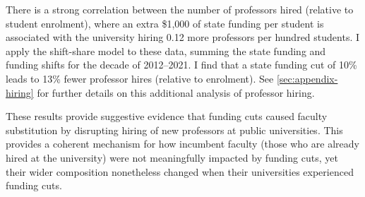 There is a strong correlation between the number of professors hired (relative to student enrolment), where an extra \$1,000 of state funding per student is associated with the university hiring 0.12 more professors per hundred students.
I apply the shift-share model to these data, summing the state funding and funding shifts for the decade of 2012--2021.
I find that a state funding cut of 10\% leads to 13\% fewer professor hires (relative to enrolment).
See \autoref{sec:appendix-hiring} for further details on this additional analysis of professor hiring.

These results provide suggestive evidence that funding cuts caused faculty substitution by disrupting hiring of new professors at public universities.
This provides a coherent mechanism for how incumbent faculty (those who are already hired at the university) were not meaningfully impacted by funding cuts, yet their wider composition nonetheless changed when their universities experienced funding cuts.

